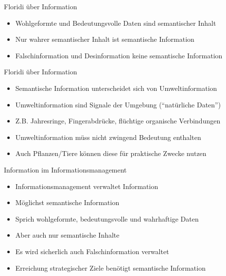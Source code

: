 \documentclass{beamer}
\begin{document}
\begin{frame}{Floridi über Information}
	
	\begin{itemize}
		\item Wohlgeformte und Bedeutungsvolle Daten sind semantischer Inhalt
		\item Nur wahrer semantischer Inhalt ist semantische Information
		\item Falschinformation und Desinformation keine semantische Information
	\end{itemize}
	
\end{frame}

\begin{frame}{Floridi über Information}
	
	\begin{itemize}
		\item Semantische Information unterscheidet sich von Umweltinformation
		\item Umweltinformation sind Signale der Umgebung (``natürliche Daten'')
		\item Z.B. Jahresringe, Fingerabdrücke, flüchtige organische Verbindungen
		\item Umweltinformation müss nicht zwingend Bedeutung enthalten
		\item Auch Pflanzen/Tiere können diese für praktische Zwecke nutzen
	\end{itemize}
	
\end{frame}


\begin{frame}{Information im Informationsmanagement}
	
	\begin{itemize}
		\item Informationsmanagement verwaltet Information
		\item Möglichst semantische Information
		\item Sprich wohlgeformte, bedeutungsvolle und wahrhaftige Daten
		\item Aber auch nur semantische Inhalte
		\item Es wird sicherlich auch Falschinformation verwaltet
		\item Erreichung strategischer Ziele benötigt semantische Information
	\end{itemize}
	
\end{frame}
\end{document}
